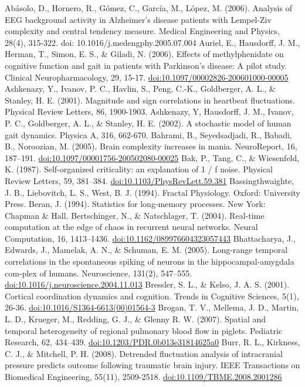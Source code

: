 \documentclass[12pt,]{book}
\begin{document}
Abásolo, D., Hornero, R., Gómez, C., García, M., López, M. (2006). Analysis of EEG background activity in Alzheimer's disease patients with Lempel-Ziv complexity and central tendency measure. Medical Engineering and Physics, 28(4), 315-322. doi: 10.1016/j.medengphy.2005.07.004
Auriel, E., Hausdorff, J. M., Herman, T., Simon, E. S., \& Giladi, N. (2006). Effects of methylphenidate on cognitive function and gait in patients with Parkinson's disease: A pilot study. Clinical Neuropharmacology, 29, 15-17. \url{doi:10.1097/00002826-200601000-00005}
Ashkenazy, Y., Ivanov, P. C., Havlin, S., Peng, C.-K., Goldberger, A. L., \& Stanley, H. E. (2001). Magnitude and sign correlations in heartbeat fluctuations. Physical Review Letters, 86, 1900-1903.
Ashkenazy, Y, Hausdorff, J. M., Ivanov, P. C., Goldberger, A. L., \& Stanley, H. E. (2002). A stochastic model of human gait dynamics. Physica A, 316, 662-670.
Bahrami, B., Seyedsadjadi, R., Babadi, B., Noroozian, M. (2005). Brain complexity increases in mania. NeuroReport, 16, 187--191. \url{doi:10.1097/00001756-200502080-00025}
Bak, P., Tang, C., \& Wiesenfeld, K. (1987). Self-organized criticality: an explanation of 1 / f noise. Physical Review Letters, 59, 381--384. \url{doi:10.1103/PhysRevLett.59.381}
Bassingthwaighte, J. B., Liebovitch, L. S., West, B. J. (1994). Fractal Physiology. Oxford: University Press.
Beran, J. (1994). Statistics for long-memory processes. New York: Chapman \& Hall.
Bertschinger, N., \& Natschlager, T. (2004). Real-time computation at the edge of chaos in recurrent neural networks. Neural Computation, 16, 1413--1436. \url{doi:10.1162/089976604323057443}
Bhattacharya, J., Edwards, J., Mamelak, A. N., \& Schuman, E. M. (2005). Long-range temporal correlations in the spontaneous spiking of neurons in the hippocampal-amygdala com-plex of humans. Neuroscience, 131(2), 547--555. \url{doi:10.1016/j.neuroscience.2004.11.013}
Bressler, S. L., \& Kelso, J. A. S. (2001). Cortical coordination dynamics and cognition. Trends in Cognitive Sciences, 5(1), 26-36. \url{doi:10.1016/S1364-6613(00)01564-3}
Brogan, T. V., Mellema, J. D., Martin, L. D., Krueger, M., Redding, G. J., \& Glenny R. W. (2007). Spatial and temporal heterogeneity of regional pulmonary blood flow in piglets. Pediatric Research, 62, 434--439. \url{doi:10.1203/PDR.0b013e31814625a0}
Burr, R. L., Kirkness, C. J., \& Mitchell, P. H. (2008). Detrended fluctuation analysis of intracranial pressure predicts outcome following traumatic brain injury. IEEE Transactions on Biomedical Engineering, 55(11), 2509-2518. \url{doi:10.1109/TBME.2008.2001286}
\end{document}
